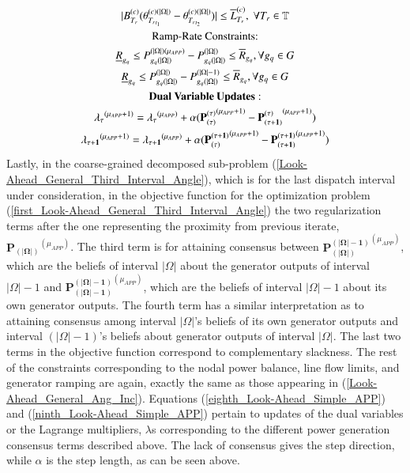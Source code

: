 \documentclass[preprint,12pt,3p]{elsarticle}
\begin{document}
\begin{subequations}
\begin{gather}
		|B_{T_r}^{(c)}(\theta_{{T_r}_{t_1}}^{(c)(|\Omega|)}-\theta_{{T_r}_{t_2}}^{(c)(|\Omega|)})|\leq{{\overline{L}}_{T_r}^{(c)}},\;\forall{T_r\in{\mathbb{T}}}\label{third1_Look-Ahead_General_Third_Interval_Angle}\\
		\text{Ramp-Rate Constraints:}\notag\\
		\underline{R}_{g_q}\leq P_{{g_q}(|\Omega|)}^{(|\Omega|)(\mu_{APP})}-P_{{g_q}(|\Omega|)}^{(|\Omega|)}\leq \overline{R}_{g_q},\forall {g_q}\in G\label{fourth_Look-Ahead_General_Third_Interval_Angle}\\
		\underline{R}_{g_q}\leq P_{{g_q}(|\Omega|)}^{(|\Omega|)}-P_{{g_q}(|\Omega|)}^{(|\Omega|-1)}\leq \overline{R}_{g_q},\forall {g_q}\in G\label{fifth_Look-Ahead_General_Third_Interval_Angle}\\
		\mathbf{Dual\:Variable \:Updates:}\notag\\
		\mathbf{\lambda_{\tau}}^{(\mu_{APP}+1)}=\mathbf{\lambda_{\tau}}^{(\mu_{APP})}+\alpha(\mathbf{P_{({\tau})}^{({\tau})}}^{(\mu_{APP}+1)}-\mathbf{P_{({\tau}+1)}^{({\tau})}}^{(\mu_{APP}+1)})\label{eighth_Look-Ahead_Simple_APP}\\
		\mathbf{\lambda_{\tau+1}}^{(\mu_{APP}+1)}=\mathbf{\lambda_{\tau+1}}^{(\mu_{APP})}+\alpha(\mathbf{P_{({\tau})}^{({\tau+1})}}^{(\mu_{APP}+1)}-\mathbf{P_{({\tau+1})}^{({\tau+1})}}^{(\mu_{APP}+1)})\label{ninth_Look-Ahead_Simple_APP}
		\end{gather}
	\end{subequations}
	Lastly, in the coarse-grained decomposed sub-problem (\ref{Look-Ahead_General_Third_Interval_Angle}), which is for the last dispatch interval under consideration, in the objective function for the optimization problem (\ref{first_Look-Ahead_General_Third_Interval_Angle}) the two regularization terms after the one representing the proximity from previous iterate, $\mathbf{P_{(|\Omega|)}}^{(\mu_{APP})}$. The third term is for attaining consensus between $\mathbf{P_{(|\Omega|)}^{(|\Omega|-1)}}^{(\mu_{APP})}$, which are the beliefs of interval $|\Omega|$ about the generator outputs of interval $|\Omega|-1$ and $\mathbf{P_{(|\Omega|-1)}^{(|\Omega|-1)}}^{(\mu_{APP})}$, which are the beliefs of interval $|\Omega|-1$ about its own generator outputs.  The fourth term has a similar interpretation as to attaining consensus among interval $|\Omega|$'s beliefs of its own generator outputs and interval $(|\Omega|-1)$'s beliefs about generator outputs of interval $|\Omega|$. The last two terms in the objective function correspond to complementary slackness. The rest of the constraints corresponding to the nodal power balance, line flow limits, and generator ramping are again, exactly the same as those appearing in (\ref{Look-Ahead_General_Ang_Inc}). Equations (\ref{eighth_Look-Ahead_Simple_APP}) and (\ref{ninth_Look-Ahead_Simple_APP}) pertain to updates of the dual variables or the Lagrange multipliers, $\lambda$s corresponding to the different power generation consensus terms described above. The lack of consensus gives the step direction, while $\alpha$ is the step length, as can be seen above.\\
\end{document}

